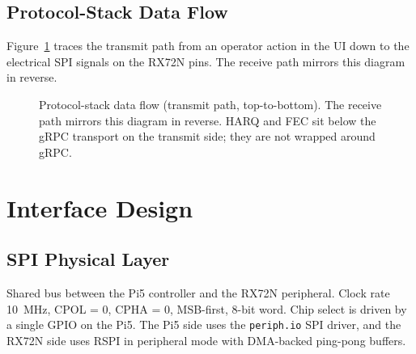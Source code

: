 \documentclass[11pt,letterpaper]{article}
\begin{document}
\subsection{Protocol-Stack Data Flow}
Figure~\ref{fig:protocol-stack} traces the transmit path from an
operator action in the UI down to the electrical SPI signals on the
RX72N pins. The receive path mirrors this diagram in reverse.

\begin{figure}[H]
\centering
{}
\caption{Protocol-stack data flow (transmit path, top-to-bottom).
The receive path mirrors this diagram in reverse. HARQ and FEC sit
below the gRPC transport on the transmit side; they are not wrapped
around gRPC.}
\label{fig:protocol-stack}
\end{figure}

\section{Interface Design}
\label{sec:interfaces}

\subsection{SPI Physical Layer}
Shared bus between the Pi5 controller and the RX72N peripheral. Clock
rate \qty{10}{\mega\hertz}, CPOL = 0, CPHA = 0, MSB-first, 8-bit word.
Chip select is driven by a single GPIO on the Pi5. The Pi5 side uses
the \texttt{periph.io} SPI driver, and the RX72N side uses RSPI in
peripheral mode with DMA-backed ping-pong buffers.
\end{document}

